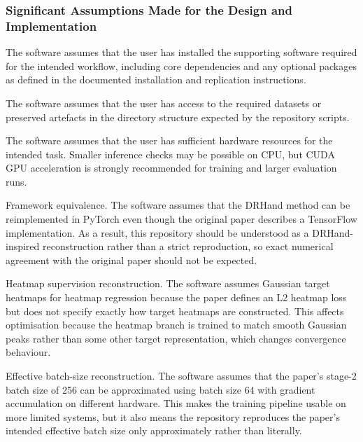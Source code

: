 ﻿\documentclass[11pt,a4paper]{article}
\begin{document}
\subsubsection{Significant Assumptions Made for the Design and Implementation}

The software assumes that the user has installed the supporting software
required for the intended workflow, including core dependencies and any
optional packages as defined in the documented installation and
replication instructions.

\medskip

\noindent
The software assumes that the user has access to the required datasets or
preserved artefacts in the directory structure expected by the repository
scripts.

\medskip

\noindent
The software assumes that the user has sufficient hardware resources for the
intended task. Smaller inference checks may be possible on CPU, but CUDA GPU
acceleration is strongly recommended for training and larger evaluation runs.

\medskip

\noindent
Framework equivalence. The software assumes that the DRHand method can be
reimplemented in PyTorch even though the original paper describes a TensorFlow
implementation. As a result, this repository should be understood as a
DRHand-inspired reconstruction rather than a strict reproduction, so exact
numerical agreement with the original paper should not be expected.

\medskip

\noindent
Heatmap supervision reconstruction. The software assumes Gaussian target
heatmaps for heatmap regression because the paper defines an L2 heatmap loss
but does not specify exactly how target heatmaps are constructed. This affects
optimisation because the heatmap branch is trained to match smooth Gaussian
peaks rather than some other target representation, which changes convergence
behaviour.

\medskip

\noindent
Effective batch-size reconstruction. The software assumes that the paper's
stage-2 batch size of 256 can be approximated using batch size 64 with
gradient accumulation on different hardware. This makes the training pipeline
usable on more limited systems, but it also means the repository reproduces
the paper's intended effective batch size only approximately rather than
literally.

\medskip
\end{document}
